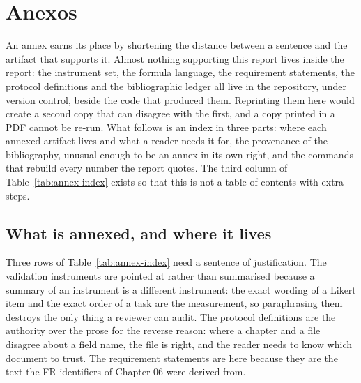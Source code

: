 \appendix
\section{Anexos}
\label{anex:anexos}

An annex earns its place by shortening the distance between a sentence and the artifact that
supports it. Almost nothing supporting this report lives inside the report: the instrument set,
the formula language, the requirement statements, the protocol definitions and the bibliographic
ledger all live in the repository, under version control, beside the code that produced them.
Reprinting them here would create a second copy that can disagree with the first, and a copy
printed in a PDF cannot be re-run. What follows is an index in three parts: where each annexed
artifact lives and what a reader needs it for, the provenance of the bibliography, unusual enough
to be an annex in its own right, and the commands that rebuild every number the report quotes.
The third column of Table~\ref{tab:annex-index} exists so that this is not a table of contents
with extra steps.

\subsection{What is annexed, and where it lives}

Three rows of Table~\ref{tab:annex-index} need a sentence of justification. The validation
instruments are pointed at rather than summarised because a summary of an instrument is a
different instrument: the exact wording of a Likert item and the exact order of a task are the
measurement, so paraphrasing them destroys the only thing a reviewer can audit. The protocol
definitions are the authority over the prose for the reverse reason: where a chapter and a
 file disagree about a field name, the file is right, and the reader needs to know
which document to trust. The requirement statements are here because they are the text the FR
identifiers of Chapter 06 were derived from.

